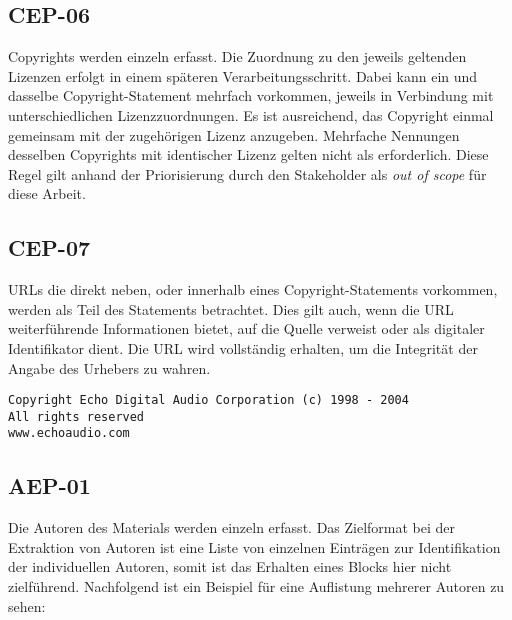 
\subsection{CEP-06}\label{subsec:cep-06}

Copyrights werden einzeln erfasst.
Die Zuordnung zu den jeweils geltenden Lizenzen erfolgt in einem späteren Verarbeitungsschritt.
Dabei kann ein und dasselbe Copyright-Statement mehrfach vorkommen, jeweils in Verbindung mit unterschiedlichen Lizenzzuordnungen.
Es ist ausreichend, das Copyright einmal gemeinsam mit der zugehörigen Lizenz anzugeben.
Mehrfache Nennungen desselben Copyrights mit identischer Lizenz gelten nicht als erforderlich.
Diese Regel gilt anhand der Priorisierung durch den Stakeholder als \textit{out of scope} für diese Arbeit.



\subsection{CEP-07}\label{subsec:cep-07}

URLs die direkt neben, oder innerhalb eines Copyright-Statements vorkommen, werden als Teil des Statements betrachtet.
Dies gilt auch, wenn die URL weiterführende Informationen bietet, auf die Quelle verweist oder als digitaler Identifikator dient.
Die URL wird vollständig erhalten, um die Integrität der Angabe des Urhebers zu wahren.

\begin{lstlisting}[keepspaces=true]
Copyright Echo Digital Audio Corporation (c) 1998 - 2004
All rights reserved
www.echoaudio.com
\end{lstlisting}


\subsection{AEP-01}\label{subsec:aep-01}

Die Autoren des Materials werden einzeln erfasst.
Das Zielformat bei der Extraktion von Autoren ist eine Liste von einzelnen Einträgen zur Identifikation der individuellen Autoren, somit ist das Erhalten eines Blocks hier nicht zielführend.
Nachfolgend ist ein Beispiel für eine Auflistung mehrerer Autoren zu sehen:

